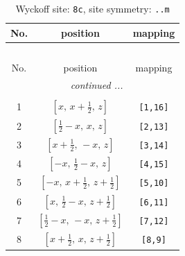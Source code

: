 \documentclass[fleqn,8pt]{jsarticle}
\begin{document}
\renewcommand{\arraystretch}{1.2}
\begin{longtable}{ccc}
\caption{Wyckoff site: {\tt 8c}, site symmetry: {\tt ..m}}
 \\
 \hline \hline
No. & position & mapping \\ \hline \endfirsthead

\multicolumn{2}{l}{\tablename\ \thetable{}} \\
 \hline \hline
No. & position & mapping \\ \hline \endhead

 \hline \hline
\multicolumn{2}{r}{\footnotesize\it continued ...} \\ \endfoot

 \hline \hline
\multicolumn{2}{r}{} \\ \endlastfoot

1 & $\left[ x,\, x + \frac{1}{2},\, z \right]$ & {\tt [1,16]} \\ \hline
2 & $\left[ \frac{1}{2} - x,\, x,\, z \right]$ & {\tt [2,13]} \\ \hline
3 & $\left[ x + \frac{1}{2},\, - x,\, z \right]$ & {\tt [3,14]} \\ \hline
4 & $\left[ - x,\, \frac{1}{2} - x,\, z \right]$ & {\tt [4,15]} \\ \hline
5 & $\left[ - x,\, x + \frac{1}{2},\, z + \frac{1}{2} \right]$ & {\tt [5,10]} \\ \hline
6 & $\left[ x,\, \frac{1}{2} - x,\, z + \frac{1}{2} \right]$ & {\tt [6,11]} \\ \hline
7 & $\left[ \frac{1}{2} - x,\, - x,\, z + \frac{1}{2} \right]$ & {\tt [7,12]} \\ \hline
8 & $\left[ x + \frac{1}{2},\, x,\, z + \frac{1}{2} \right]$ & {\tt [8,9]} \\
\end{longtable}
\renewcommand{\arraystretch}{1.2}
\end{document}
